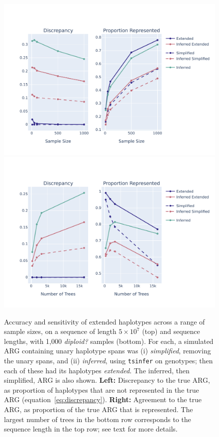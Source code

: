 \documentclass[10pt,twoside,lineno]{gsajnl}
\newcommand{\tsinfer}{\texttt{tsinfer}}
\newcommand{\comment}[1]{{\color{violet} \it #1}}
\begin{document}
\begin{figure}
	\begin{center}
		\includegraphics[width=0.8\linewidth]{newplots_wo_ee/discrepancy_over_sample_5e7_new.pdf}
		\includegraphics[width=0.8\linewidth]{newplots_wo_ee/discrepancy_over_seqlen_1000s_new_5e7.pdf}
	\end{center}
    \caption{
        Accuracy and sensitivity of extended haplotypes
        across a range of sample sizes, on a sequence of length $5\times10^7$ (top)
        and sequence lengths, with 1,000 \comment{diploid?} samples (bottom).
        For each, a simulated ARG containing unary haplotype spans
        was (i) \emph{simplified}, removing the unary spans,
        and (ii) \emph{inferred}, using \tsinfer{} on genotypes;
        then each of these had its haplotypes \emph{extended}.
        The inferred, then simplified, ARG is also shown.
        \textbf{Left:} Discrepancy to the true ARG,
        as proportion of haplotypes that are not represented in the true ARG
        (equation~\eqref{eq:discrepancy}).
        \textbf{Right:} Agreement to the true ARG,
        as proportion of the true ARG that is represented.
        The largest number of trees in the bottom row corresponds
        to the sequence length in the top row;
        see text for more details.
    }
    \label{fig:discrepancy}
\end{figure}
\end{document}
